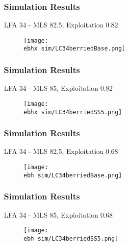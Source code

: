 \documentclass{beamer}
\newcommand{\ebh}{\string~/bio.data/bio.lobster/figures/LFA3438Framework2019/} %
\newcommand{\ebhx}{\string~/bio.data/bio.lobster/figures/LFA3438Framework2019/figures/Brad/} %
\begin{document}
\begin{frame}
\frametitle{Simulation Results}
LFA 34 - MLS 82.5, Exploitation 0.82
\begin{figure}
        \begin{center}
            \texttt{[image: \\ebhx sim/LC34berriedBase.png]}
        \end{center}
    \end{figure}
\end{frame}



\begin{frame}
\frametitle{Simulation Results}
LFA 34 - MLS 85, Exploitation 0.82
\begin{figure}
        \begin{center}
            \texttt{[image: \\ebhx sim/LC34berriedSS5.png]}
        \end{center}
    \end{figure}
\end{frame}



\begin{frame}
\frametitle{Simulation Results}
LFA 34 - MLS 82.5, Exploitation 0.68
\begin{figure}
        \begin{center}
            \texttt{[image: \\ebh sim/LC34berriedBase.png]}
        \end{center}
    \end{figure}
\end{frame}



\begin{frame}
\frametitle{Simulation Results}
LFA 34 - MLS 85, Exploitation 0.68
\begin{figure}
        \begin{center}
            \texttt{[image: \\ebh sim/LC34berriedSS5.png]}
        \end{center}
    \end{figure}
\end{frame}



\end{document}
